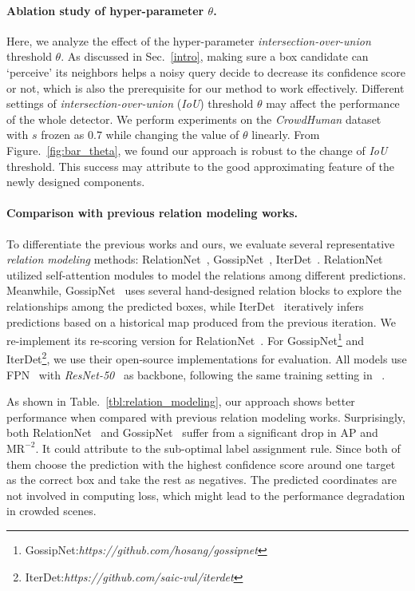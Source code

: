 \documentclass[final]{cvpr}
\begin{document}
\vspace{-0.5cm}
\paragraph{Ablation study of hyper-parameter \textbf{${\theta}$}.}
Here, we analyze the effect of the hyper-parameter \textit{intersection-over-union} threshold $\theta$. As discussed in Sec.~\ref{intro}, making sure a box candidate can `perceive' its neighbors helps a noisy query decide to decrease its confidence score or not, which is also the prerequisite for our method to work effectively. Different settings of \textit{intersection-over-union} (\emph{IoU}) threshold $\theta$ may affect the performance of the whole detector. We perform experiments on the \emph{CrowdHuman} dataset~\cite{shao2018crowdhuman} with $s$ frozen as $0.7$ while changing the value of $\theta$ linearly. From Figure.~\ref{fig:bar_theta}, we found our approach is robust to the change of \emph{IoU} threshold. This success may attribute to the good approximating feature of the newly designed components.

\vspace{-0.5cm}
\paragraph{Comparison with previous relation modeling works.}
To differentiate the previous works and ours, we evaluate several representative \textit{relation modeling} methods: RelationNet~\cite{hu2018relation}, GossipNet~\cite{gossipnet}, IterDet~\cite{iterdet2021}. RelationNet~\cite{hu2018relation} utilized self-attention modules to model the relations among different predictions. Meanwhile, GossipNet~\cite{gossipnet} uses several hand-designed relation blocks to explore the relationships among the predicted boxes, while IterDet~\cite{iterdet2021} iteratively infers predictions based on a historical map produced from the previous iteration. We re-implement its re-scoring version for RelationNet~\cite{hu2018relation}. For GossipNet\footnote{GossipNet:\textit{https://github.com/hosang/gossipnet}} and IterDet\footnote{IterDet:\textit{https://github.com/saic-vul/iterdet}}, we use their open-source implementations for evaluation. All models use FPN~\cite{lin2017feature} with \emph{ResNet-50}~\cite{he2016deep} as backbone, following the same training setting in ~\cite{gossipnet, hu2018relation,lin2017feature}. 

As shown in Table.~\ref{tbl:relation_modeling}, our approach shows better performance when compared with previous relation modeling works. Surprisingly, both RelationNet~\cite{hu2018relation} and GossipNet~\cite{gossipnet} suffer from a significant drop in $\text{AP}$ and $\text{MR}^{-2}$. It could attribute to the sub-optimal label assignment rule. Since both of them choose the prediction with the highest confidence score around one target as the correct box and take the rest as negatives. The predicted coordinates are not involved in computing loss, which might lead to the performance degradation in crowded scenes.
\end{document}
